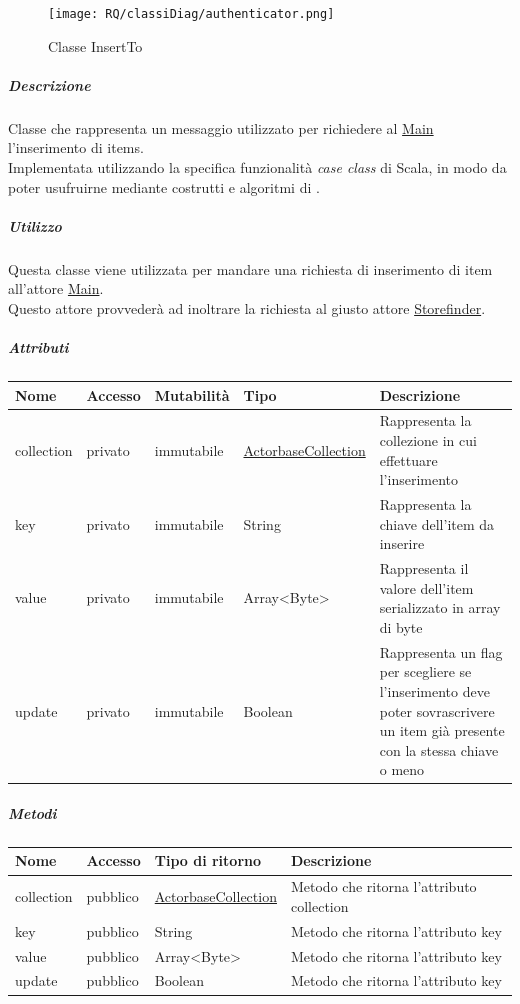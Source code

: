 \documentclass{scalatekids-article}
\begin{document}
\begin{figure}[H]
  \begin{center}
    \texttt{[image: RQ/classiDiag/authenticator.png]}
    \caption{Classe InsertTo}
  \end{center}
\end{figure}

\subparagraph{Descrizione}
Classe che rappresenta un messaggio utilizzato per richiedere al
\hyperref[sec:actorbase::actorsystem::actors::main::Main]{Main} l'inserimento di items.\\Implementata utilizzando la specifica funzionalità \textit{case class} di Scala,
in modo da poter usufruirne mediante costrutti e algoritmi di
.

\subparagraph{Utilizzo}
Questa classe viene utilizzata per mandare una richiesta di inserimento di
item all'attore
\hyperref[sec:actorbase::actorsystem::actors::main::Main]{Main}.\\Questo attore
provvederà ad inoltrare la richiesta al giusto attore \hyperref[sec:actorbase::actorsystem::actors::storefinder::Storefinder]{Storefinder}.

\subparagraph{Attributi}
\begin{tabular}{| p{2cm} | p{1.5cm} | p{2cm} | p{3cm} | p{8.5cm} |}
  \hline
  Nome & Accesso & Mutabilità & Tipo & Descrizione\\
  \hline
  collection & privato & immutabile & \hyperref[sec:actorbase::actorsystem::utils::ActorbaseCollection]{ActorbaseCollection} & Rappresenta la collezione in cui effettuare l'inserimento \\
  \hline
  key & privato & immutabile & String & Rappresenta la chiave dell'item da inserire\\
  \hline
  value & privato & immutabile & Array<Byte> & Rappresenta il valore dell'item serializzato in array di byte\\
  \hline
  update & privato & immutabile & Boolean & Rappresenta un flag per scegliere se l'inserimento deve poter sovrascrivere un item già presente con la stessa chiave o meno\\
  \hline
\end{tabular}

\subparagraph{Metodi}
\begin{tabular}{| l | l | l | l |}
  \hline
  Nome & Accesso & Tipo di ritorno & Descrizione\\
  \hline
  collection & pubblico & \hyperref[sec:actorbase::actorsystem::utils::ActorbaseCollection]{ActorbaseCollection} & Metodo che ritorna l'attributo collection\\
  \hline
  key & pubblico & String & Metodo che ritorna l'attributo key\\
  \hline
  value & pubblico & Array<Byte> & Metodo che ritorna l'attributo key\\
  \hline
  update & pubblico & Boolean & Metodo che ritorna l'attributo key\\
  \hline
\end{tabular}
\end{document}
